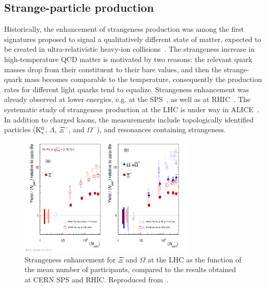 \subsection{Strange-particle production}
\label{subsecks:strangespectra}
Historically, the enhancement of strangeness production was among the first signatures proposed to signal a qualitatively different state of matter, expected to be created in ultra-relativistic heavy-ion collisions~\cite{Rafelski:1982pu,Koch:1986ud}. The strangeness increase in high-temperature QCD matter is motivated by two reasons: the relevant quark masses drop from their constituent to their bare values, and then the strange-quark mass becomes comparable to the temperature, consequently the production rates for different light quarks tend to equalize. Strangeness enhancement was already observed at lower energies, e.g. at the SPS~\cite{Margetis:2000sv,Andersen:1999ym,Antinori:2010jm,Alt:2008qm}, as well as at RHIC~\cite{Abelev:2007xp}. The systematic study of strangeness production at the LHC is under way in ALICE~\cite{ABELEV:2013zaa,Abelev:2013xaa}. In addition to charged kaons, the measurements include topologically identified particles (K$_{\rm s}^0$, $\Lambda$, $\Xi^-$, and $\Omega^-$), and resonances containing strangeness.

\begin{figure}
\centering
\includegraphics[width=0.75\textwidth]{ksfigures/StrangenessEnhancemet.pdf}
\caption{Strangeness enhancement for $\Xi$ and $\Omega$ at the LHC as the function of the mean number of participants, compared to the results obtained at CERN SPS and RHIC. Reproduced from~\cite{ABELEV:2013zaa}.}
\label{figks:StrangeEnhancement}
\end{figure}


